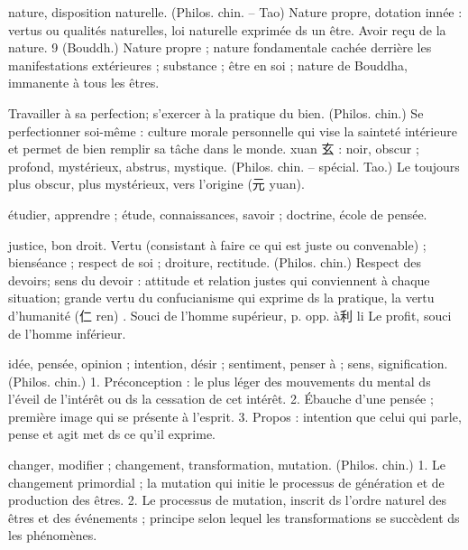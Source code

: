 \begin{Def}[xing 性 ]
    nature, disposition naturelle.     (Philos. chin. – Tao) Nature propre, dotation innée : vertus ou qualités naturelles, loi naturelle exprimée ds un être. Avoir reçu de la nature.  9     (Bouddh.) Nature propre ; nature fondamentale cachée derrière les manifestations extérieures ; substance ; être en soi ; nature de Bouddha, immanente à tous les êtres. 
\end{Def}
\begin{Def}[xiushen 修身]
    Travailler à sa perfection; s’exercer à la pratique du bien. (Philos. chin.) Se perfectionner soi-même : culture morale personnelle qui vise la sainteté intérieure et permet de bien remplir sa tâche dans le monde. xuan 玄 : noir, obscur ; profond, mystérieux, abstrus, mystique. (Philos. chin. – spécial. Tao.) Le toujours plus obscur, plus mystérieux, vers l’origine (元 yuan). 
\end{Def}
\begin{Def}[xue 學]
    étudier, apprendre ; étude, connaissances, savoir ; doctrine, école de pensée.
\end{Def}
\begin{Def}[yi 義]
    justice, bon droit. Vertu (consistant à faire ce qui est juste ou convenable) ; bienséance ; respect de soi ; droiture, rectitude. (Philos. chin.) Respect des devoirs; sens du devoir : attitude et relation justes qui conviennent à chaque situation; grande vertu du confucianisme qui exprime ds la pratique, la vertu d’humanité (仁 ren) . Souci de l’homme supérieur, p. opp. à利 li Le profit, souci de l’homme inférieur. 
\end{Def}
\begin{Def}[yi 意]
    idée, pensée, opinion ; intention, désir ; sentiment, penser à ; sens, signification. (Philos. chin.) 1. Préconception : le plus léger des mouvements du mental ds l’éveil de l’intérêt ou ds la cessation de cet intérêt. 2. Ébauche d’une pensée ; première image qui se présente à l’esprit. 3. Propos : intention que celui qui parle, pense et agit met ds ce qu’il exprime. 
\end{Def}
\begin{Def}[yi 易]
    changer, modifier ; changement, transformation, mutation. (Philos. chin.) 1. Le changement primordial ; la mutation qui initie le processus de génération et de production des êtres. 2. Le processus de mutation, inscrit ds l’ordre naturel des êtres et des événements ; principe selon lequel les transformations se succèdent ds les phénomènes.
\end{Def}
